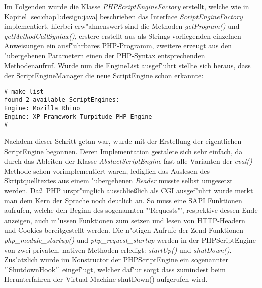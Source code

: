Im Folgenden wurde die Klasse \emph{PHPScriptEngineFactory} erstellt, welche wie in Kapitel
\ref{sec:chap1:design:java} beschrieben
das Interface \emph{ScriptEngineFactory} implementiert, hierbei erw"ahnenswert sind die Methoden 
\emph{getProgram()} und \emph{getMethodCallSyntax()}, erstere erstellt aus als Strings vorliegenden
einzelnen Anweisungen ein ausf"uhrbares PHP-Programm, zweitere erzeugt aus den "ubergebenen Parametern
einen der PHP-Syntax entsprechenden Methodenaufruf. Wurde nun die EngineList ausgef"uhrt stellte sich heraus,
dass der ScriptEngineManager die neue ScriptEngine schon erkannte:
\begin{lstlisting}[caption=Neue ScriptEngine]
# make list
found 2 available ScriptEngines:
Engine: Mozilla Rhino
Engine: XP-Framework Turpitude PHP Engine
#
\end{lstlisting}

Nachdem dieser Schritt getan war, wurde mit der Erstellung der eigentlichen ScriptEngine begonnen. Deren
Implementation gestalete sich sehr einfach, da durch das Ableiten der Klasse \emph{AbstactScriptEngine} 
fast alle Varianten der \emph{eval()}-Methode schon vorimplementiert waren, lediglich das Auslesen des
Skriptquelltextes aus einem "ubergebenen \emph{Reader} musste selbst umgesetzt werden. 
Da\ss\ PHP urspr"unglich ausschlie\ss lich als CGI ausgef"uhrt wurde merkt man dem Kern der Sprache noch
deutlich an. So muss eine SAPI Funktionen aufrufen, welche den Beginn des sogenannten "'Requests"', respektive
dessen Ende anzeigen, auch m"ussen Funktionen zum setzen und lesen von HTTP-Headern und Cookies bereitgestellt
werden. Die n"otigen Aufrufe der Zend-Funktionen \emph{php\_module\_startup()} und \emph{php\_request\_startup}
werden in der PHPScriptEngine von zwei privaten, nativen Methoden erledigt: \emph{startUp()} und \emph{shutDown()}. 
Zus"atzlich wurde im Konstructor der PHPScriptEngine ein sogenannter "'ShutdownHook"' eingef"ugt, welcher daf"ur 
sorgt dass zumindest beim Herunterfahren der Virtual Machine shutDown() aufgerufen wird.

